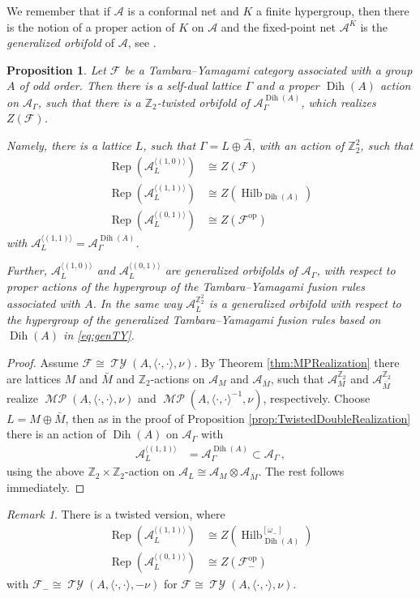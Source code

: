 \documentclass[twoside,11pt,reqno]{amsart}
\newtheorem{prop}[thm]{Proposition}
\theoremstyle{definition}
\theoremstyle{remark}
\newtheorem{rmk}[thm]{Remark}
\newcommand{\cF}{\mathcal{F}}
\newcommand{\A}{\mathcal{A}}
\newcommand{\ZZ}{\mathbb{Z}}
\DeclareMathOperator{\Rep}{Rep}
\newcommand{\op}{\mathrm{op}}
\DeclareMathOperator{\Dih}{Dih}
\DeclareMathOperator*{\TY}{\mathcal{TY}}
\DeclareMathOperator*{\MP}{\mathcal{MP}}
\DeclareMathOperator{\Vect}{Hilb}
\newcommand{\bi}[2]{\langle #1,#2\rangle}
\newcommand{\bislotslot}{\bi\cdot\cdot}
\newcommand{\myemph}[1]{\emph{#1}}
\begin{document}
We remember that if $\A$ is a conformal net and $K$ a finite hypergroup, 
then there is the notion of a proper action of $K$ on $\A$ and the fixed-point
net $\A^K$ is the \myemph{generalized orbifold} of $\A$, see \cite{Bi2016}.
\begin{prop}
  \label{prop:TwistedGeneralizedOrbifold}
  Let $\cF$ be a Tambara--Yamagami category associated with a group 
  $A$ of odd order. 
  Then there is a self-dual lattice $\Gamma$ and a proper $\Dih(A)$ action 
  on $\A_\Gamma$, such that there is a $\ZZ_2$-twisted orbifold of 
  $\A_\Gamma^{\Dih(A)}$, which realizes $Z(\cF)$.

  Namely, there is a lattice $L$, such that $\Gamma=L\oplus \hat A$,
  with an action of $\ZZ_2^2$, such that
  \begin{align}
    \Rep(\A_L^{\langle(1,0)\rangle})&\cong Z(\cF)\\
    \Rep(\A_L^{\langle(1,1)\rangle})&\cong Z(\Vect_{\Dih(A)})\\
    \Rep(\A_L^{\langle(0,1)\rangle})&\cong Z(\cF^\op)
  \end{align}
  with $\A_L^{\langle (1,1)\rangle} = \A_\Gamma^{\Dih(A)}$.

  Further,  $\A_L^{\langle(1,0)\rangle}$ and $\A_L^{\langle(0,1)\rangle}$
  are generalized orbifolds of $\A_\Gamma$, with respect to 
  proper actions of the hypergroup of the Tambara--Yamagami fusion rules 
  associated with $A$.
  In the same way $\A_L^{\ZZ_2^2}$ is a generalized orbifold with respect to the  hypergroup of the generalized Tambara--Yamagami fusion rules based on 
  $\Dih(A)$ in \eqref{eq:genTY}.
\end{prop}
\begin{proof}
  Assume $\cF\cong\TY(A,\bislotslot,\nu)$. 
  By Theorem \ref{thm:MPRealization}
  there are lattices $M$ and $\bar M$ and $\ZZ_2$-actions on $\A_M$ and 
  $\A_{\bar M}$, such that $\A^{\ZZ_2}_M$ and 
  $\A_{\bar M}^{\ZZ_2}$ realize
  $\MP(A,\bislotslot,\nu)$ and $\MP(A, \bislotslot^{-1},\nu)$, respectively.
  Choose $L=M\oplus \bar M$, then as in the proof of Proposition 
  \ref{prop:TwistedDoubleRealization} there is an action of $\Dih(A)$ on
  $\A_\Gamma$ with
  \begin{align}
    \A_{L}^{\langle(1,1)\rangle}&=\A_\Gamma^{\Dih(A)}\subset \A_\Gamma\,,
  \end{align}
  using the above 
  $\ZZ_2\times\ZZ_2$-action on $\A_{L}\cong \A_M\otimes\A_{\bar M}$.
  The rest follows immediately.
\end{proof}
\begin{rmk}
  There is a twisted version, where 
  \begin{align}
    \Rep(\A_L^{\langle(1,1)\rangle})&\cong Z(\Vect^{[\omega_-]}_{\Dih(A)})\\
    \Rep(\A_L^{\langle(0,1)\rangle})&\cong Z(\cF_-^\op)
  \end{align}
  with $\cF_-\cong \TY(A,\bislotslot,-\nu)$ for 
  $\cF\cong \TY(A,\bislotslot,\nu)$.
\end{rmk}
\end{document}
